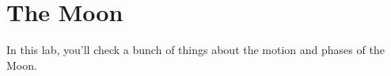 \chapter{The Moon}


In this lab, you'll check a bunch 
of things about the motion and phases of the Moon.












